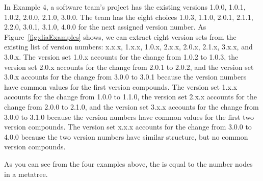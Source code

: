 \documentclass[conference]{IEEEtran}
\begin{document}
In Example 4, a software team's project has the existing versions 1.0.0, 1.0.1, 1.0.2, 2.0.0, 2.1.0, 3.0.0.
 The team has the eight choices 1.0.3, 1.1.0, 2.0.1, 2.1.1, 2.2.0, 3.0.1, 3.1.0, 4.0.0 for the next assigned version number. 
As Figure~\ref{fig:diaExamples} shows, we can extract eight version sets from the existing list of version numbers: x.x.x, 1.x.x, 1.0.x, 2.x.x, 2.0.x, 2.1.x, 3.x.x, and 3.0.x. 
The version set 1.0.x accounts for the change from 1.0.2 to 1.0.3, the version set 2.0.x accounts for the change from 2.0.1 to 2.0.2, and the version set 3.0.x accounts for the change from 3.0.0 to 3.0.1 because the version numbers have common values for the first version compounds. 
The version set 1.x.x accounts for the change from 1.0.0 to 1.1.0, the version set 2.x.x accounts for the change from 2.0.0 to 2.1.0, and the version set 3.x.x accounts for the change from 3.0.0 to 3.1.0 because the version numbers have common values for the first two version compounds. 
The version set x.x.x accounts for the change from 3.0.0 to 4.0.0 because the two version numbers have similar structure, but no common version compounds.

As you can see from the four examples above, the \numberchoices is equal to the number nodes in a metatree.

 



 



\end{document}
